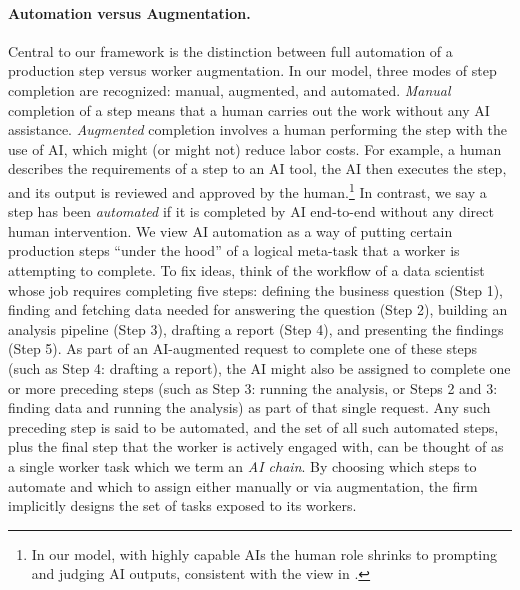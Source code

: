 \paragraph{Automation versus Augmentation.}
Central to our framework is the distinction between full automation of a production step versus worker augmentation.
In our model, three modes of step completion are recognized: manual, augmented, and automated.
\emph{Manual} completion of a step means that a human carries out the work without any AI assistance.
\emph{Augmented} completion involves a human performing the step with the use of AI, which might (or might not) reduce labor costs.
For example, a human describes the requirements of a step to an AI tool, the AI then executes the step, and its output is reviewed and approved by the human.\footnote{
In our model, with highly capable AIs the human role shrinks to prompting and judging AI outputs, consistent with the view in \cite{agrawal2019exploring}.
}
In contrast, we say a step has been \emph{automated} if it is completed by AI end-to-end without any direct human intervention.
We view AI automation as a way of putting certain production steps ``under the hood'' of a logical meta-task that a worker is attempting to complete.
To fix ideas, think of the workflow of a data scientist whose job requires completing five steps: defining the business question (Step 1), finding and fetching data needed for answering the question (Step 2), building an analysis pipeline (Step 3), drafting a report (Step 4), and presenting the findings (Step 5).
As part of an AI-augmented request to complete one of these steps (such as Step 4: drafting a report), the AI might also be assigned to complete one or more preceding steps (such as Step 3: running the analysis, or Steps 2 and 3: finding data and running the analysis) as part of that single request.
Any such preceding step is said to be automated, and the set of all such automated steps, plus the final step that the worker is actively engaged with, can be thought of as a single worker task which we term an \emph{AI chain}.
By choosing which steps to automate and which to assign either manually or via augmentation, the firm implicitly designs the set of tasks exposed to its workers.


